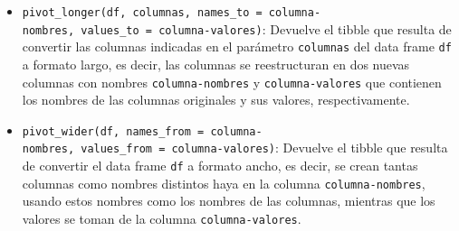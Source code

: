 \documentclass[
  a4paper,
]{scrreport}
\theoremstyle{definition}
\theoremstyle{definition}
\theoremstyle{remark}
\begin{document}
\begin{itemize}
\item
  \texttt{pivot\_longer(df,\ columnas,\ names\_to\ =\ columna-nombres,\ values\_to\ =\ columna-valores)}:
  Devuelve el tibble que resulta de convertir las columnas indicadas en
  el parámetro \texttt{columnas} del data frame \texttt{df} a formato
  largo, es decir, las columnas se reestructuran en dos nuevas columnas
  con nombres \texttt{columna-nombres} y \texttt{columna-valores} que
  contienen los nombres de las columnas originales y sus valores,
  respectivamente.
\item
  \texttt{pivot\_wider(df,\ names\_from\ =\ columna-nombres,\ values\_from\ =\ columna-valores)}:
  Devuelve el tibble que resulta de convertir el data frame \texttt{df}
  a formato ancho, es decir, se crean tantas columnas como nombres
  distintos haya en la columna \texttt{columna-nombres}, usando estos
  nombres como los nombres de las columnas, mientras que los valores se
  toman de la columna \texttt{columna-valores}.
\end{itemize}
\end{document}
